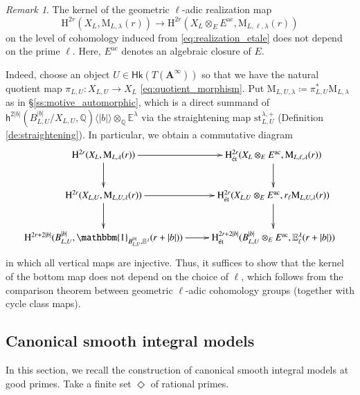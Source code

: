 \documentclass[12pt]{amsart}
\numberwithin{equation}{section}
\theoremstyle{plain}
\theoremstyle{definition}
\theoremstyle{remark}
\newtheorem{remark}[proposition]{Remark}
\renewcommand{\b}[1]{\mathbf{#1}}
\renewcommand{\d}[1]{\mathbb{#1}}
\renewcommand{\r}[1]{\mathrm{#1}}
\renewcommand{\sf}[1]{\mathsf{#1}}
\renewcommand{\(}{\left(}
\renewcommand{\)}{\right)}
\newcommand{\ang}[1]{\langle{#1}\rangle}
\newcommand{\bA}{\b A}
\newcommand{\dE}{\d E}
\newcommand{\dQ}{\d Q}
\newcommand{\rH}{\r H}
\newcommand{\rM}{\r M}
\newcommand{\sfh}{\sf h}
\newcommand{\ac}{\r{ac}}
\newcommand{\et}{{\acute{\r{e}}\r{t}}}
\newcommand{\st}{\r{st}}
\newcommand{\Hk}{\sf{Hk}}
\begin{document}
\begin{remark}
The kernel of the geometric $\ell$-adic realization map
\[
\rH^{2r}(X_L,\rM_{L,\lambda}(r))\to\rH^{2r}(X_L\otimes_EE^\ac,\rM_{L,\ell,\lambda}(r))
\]
on the level of cohomology induced from \eqref{eq:realization_etale} does not depend on the prime $\ell$. Here, $E^\ac$ denotes an algebraic closure of $E$.

Indeed, choose an object $U\in \Hk(T(\bA^\infty))$ so that we have the natural quotient map $\pi_{L,U}\colon X_{L,U}\to X_L$ \eqref{eq:quotient_morphism}. Put $\rM_{L,U,\lambda}\coloneqq\pi_{L,U}^*\rM_{L,\lambda}$ as in \S\ref{ss:motive_automorphic}, which is a direct summand of $\sfh^{2|b|}(B_{L,U}^{|b|}/X_{L,U},\dQ)\ang{|b|}\otimes_\dQ\dE^\lambda$ via the straightening map $\st_{L,U}^{\lambda,+}$ (Definition \ref{de:straightening}). In particular, we obtain a commutative diagram
\[
\xymatrix{
\rH^{2r}(X_L,\rM_{L,\lambda}(r)) \ar[r]\ar[d] & \rH^{2r}_{\et}(X_L\otimes_EE^\ac,\rM_{L,\ell,\lambda}(r)) \ar[d] \\
\rH^{2r}(X_{L,U},\rM_{L,U,\lambda}(r))
\ar[r]\ar[d] & \rH^{2r}_{\et}(X_{L,U}\otimes_EE^\ac,r_\ell\rM_{L,U,\lambda}(r)) \ar[d] \\
\rH^{2r+2|b|}(B_{L,U}^{|b|},\mathbbm{1}_{B_{L,U}^{|b|},\dE^\lambda}(r+|b|)) \ar[r]& \rH^{2r+2|b|}_{\et}(B_{L,U}^{|b|}\otimes_EE^\ac,\dE^\lambda_\ell(r+|b|))
}
\]
in which all vertical maps are injective. Thus, it suffices to show that the kernel of the bottom map does not depend on the choice of $\ell$, which follows from the comparison theorem between geometric $\ell$-adic cohomology groups (together with cycle class maps).
\end{remark}






\subsection{Canonical smooth integral models}
\label{ss:integral_model}

In this section, we recall the construction of canonical smooth integral models at good primes. Take a finite set $\Diamond$ of rational primes.
\end{document}
